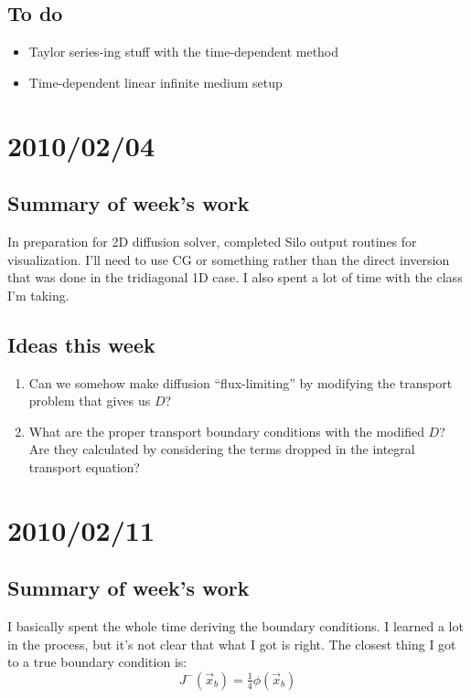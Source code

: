 \documentclass[11pt]{SRJresearch}
\begin{document}
\subsection{To do}
\begin{itemize}
  \item Taylor series-ing stuff with the time-dependent method

  \item Time-dependent linear infinite medium setup
\end{itemize}
\section{2010/02/04}

\subsection{Summary of week's work}
In preparation for 2D diffusion solver, completed Silo output routines for
visualization. I'll need to use
CG or something rather
than the direct inversion that was done in the tridiagonal 1D case. I also
spent a lot of time with the class I'm taking.

\subsection{Ideas this week}
\begin{enumerate}
\item Can we somehow make diffusion ``flux-limiting'' by modifying the transport
problem that gives us $D$?

\item What are the proper transport boundary conditions with the modified $D$?
  Are they calculated by considering the terms dropped in the integral
  transport equation?

\end{enumerate}

\section{2010/02/11}

\subsection{Summary of week's work}
I basically spent the whole time deriving the boundary conditions.
I learned a lot in the process, but it's not clear that what I got is right.
The closest thing I got to a true boundary condition is:
\begin{equation*}
  J^-(\vec{x}_b) = \tfrac14 \phi(\vec{x}_b)
\end{equation*}
\end{document}
